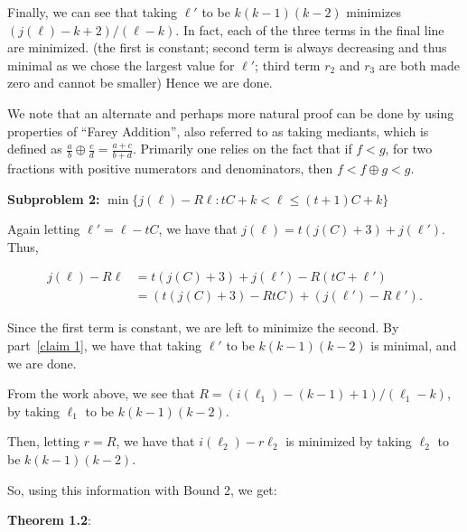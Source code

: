 \documentclass{article}
\newcommand{\dc}[1]{}%
\newcommand{\zh}[1]{}%
\begin{document}
Finally, we can see that taking $\ell'$ to be $k(k-1)(k-2)$ minimizes $(j(\ell)-k+2)/(\ell-k)$. In fact, each of the three terms in the final line are minimized. (the first is constant; second term is always decreasing and thus minimal as we chose the largest value for $\ell'$; third term $r_2$ and $r_3$ are both made zero and cannot be smaller) Hence we are done. 

\vspace{.75em}
We note that an alternate and perhaps more natural proof can be done by using properties of ``Farey Addition'', also referred to as taking mediants, which is defined as $\frac{a}{b}\oplus \frac{c}{d} = \frac{a+c}{b+d}$. Primarily one relies on the fact that if $f < g$, for two fractions with positive numerators and denominators, then $f < f \oplus g < g$.\dc{ maybe put this in a footnote and/or appendix}\zh{ footnote seems reasonable}

\vspace{1.75em}
\textbf{Subproblem 2:} $\min \{ j(\ell)-R\ell : tC+k <\ell\leq  (t+1)C+k\}$

Again letting $\ell' = \ell - tC$, we have that $j(\ell) = t(j(C)+3) +j(\ell')$. Thus,

\begin{align*}
    j(\ell)-R\ell &= t(j(C)+3) +j(\ell') - R(tC+\ell')\\
    &= (t(j(C)+3) - RtC) + (j(\ell') - R\ell').
\end{align*} 

 Since the first term is constant, we are left to minimize the second. By part~\ref{claim 1}\dc{ using ``step'' is confusing (reminds of the algorithm to construct $g_\ell$, not the previous claims). I would give the claim a name (lemma, proposition, whatever) to make it easier to backref}, we have that taking $\ell'$ to be $k(k-1)(k-2)$ is minimal, and we are done.

\vspace{1.75em}

From the work above, we see that $R = (i(\ell_1)-(k-1)+1)/(\ell_1-k)$, by taking $\ell_1$ to be $k(k-1)(k-2)$.

Then, letting $r=R$\dc{ Then what was the point in using $r$ at all? Just use $R$!}\zh{ yeah I should do this}, we have that $i(\ell_2)-r\ell_2$ is minimized by taking $\ell_2$ to be $k(k-1)(k-2)$.

So, using this information with Bound 2, we get:

\textbf{Theorem\dc{amsthm, or at the very least write out ``theorem''} 1.2}:
\end{document}
